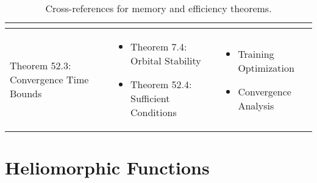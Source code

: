 \begin{table}[h]
\begin{tabular}{|l|p{7cm}|p{4cm}|}
\begin{itemize}
\end{itemize} \\
\hline
Theorem 52.3: Convergence Time Bounds &
\begin{itemize}
    \item Theorem 7.4: Orbital Stability
    \item Theorem 52.4: Sufficient Conditions
\end{itemize} &
\begin{itemize}
    \item Training Optimization
    \item Convergence Analysis
\end{itemize} \\
\hline
\end{tabular}
\caption{Cross-references for memory and efficiency theorems.}
\label{tab:xref_memory}
\end{table}

\section{Heliomorphic Functions}

